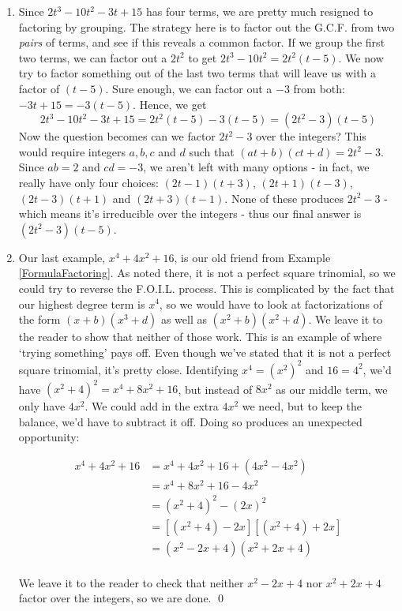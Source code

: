 \begin{ex}
\begin{enumerate}
\item Since $2t^3 - 10t^2 - 3t + 15$  has four terms, we are pretty much resigned to factoring by grouping.  The strategy here is to factor out the G.C.F. from two \textit{pairs} of terms, and see if this reveals a common factor. If we group the first two terms, we can factor out a $2t^2$ to get $2t^3 - 10t^2 = 2t^2(t-5)$.  We now try to factor something out of the last two terms that will leave us with a factor of $(t-5)$.  Sure enough, we can factor out a $-3$ from both:  $-3t + 15 = -3(t-5)$.  Hence, we get \[ 2t^3 - 10t^2 - 3t + 15 = 2t^2(t-5) - 3(t-5) = (2t^2-3)(t-5)\] Now the question becomes can we factor $2t^2 - 3$ over the integers?  This would require integers $a, b, c$ and $d$ such that $(at + b)(ct + d) = 2t^2 - 3$.   Since $ab = 2$ and $cd = -3$, we aren't left with many options - in fact, we really have only four choices:  $(2t - 1)(t+3)$, $(2t+1)(t-3)$, $(2t - 3)(t+1)$ and $(2t+3)(t-1)$.  None of these produces $2t^2 - 3$ - which means it's irreducible over the integers - thus our final answer is $(2t^2-3)(t-5)$.

\item  Our last example, $x^4 + 4x^2 + 16$, is our old friend from Example \ref{FormulaFactoring}.  As noted there, it is not a perfect square trinomial, so we could try to reverse the F.O.I.L. process. This is complicated by the fact that our highest degree term is $x^4$, so we would have to look at factorizations of the form $(x+b)(x^3+d)$ as well as $(x^2 + b)(x^2 + d)$.  We leave it to the reader to show that neither of those work.  This is an example of where `trying something' pays off.  Even though we've stated that it is not a perfect square trinomial, it's pretty close.  Identifying $x^4 = (x^2)^2$ and $16 = 4^2$, we'd have $(x^2 + 4)^2 = x^4 + 8x^2 + 16$, but instead of $8x^2$ as our middle term, we only have $4x^2$. We could add in the extra $4x^2$ we need, but to keep the balance, we'd have to subtract it off.  Doing so produces an unexpected opportunity: 

\begin{align*}
x^4 + 4x^2 + 16 & = x^4 + 4x^2 + 16 + (4x^2 - 4x^2) \tag{Adding and subtracting the same term} \\
& = x^4 + 8x^2 + 16 - 4x^2 \tag{Rearranging terms} \\
& = (x^2 + 4)^2 - (2x)^2 \tag{Factoring perfect square trinomial} \\
& = [(x^2 +4) - 2x][ (x^2 + 4) + 2x] \tag{Difference of Squares:  $a= (x^2 + 4)$, $b = 2x$}\\
& = (x^2 - 2x + 4)(x^2 + 2x + 4) \tag{Rearraging terms} \\
\end{align*}

We leave it to the reader to check that neither $x^2 - 2x + 4$ nor $x^2 + 2x + 4$ factor over the integers, so we are done. \qed

\end{enumerate}

\end{ex}

